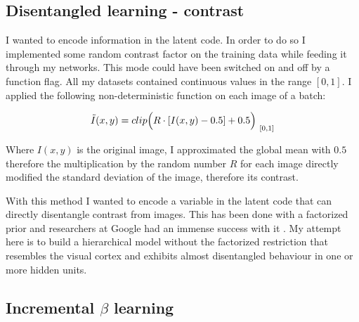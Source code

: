 \documentclass[12pt, english]{article}
\begin{document}
\vspace{7mm}

\subsection{Disentangled learning - contrast}

\vspace{5mm}

\par I wanted to encode information in the latent code. In order to do so I implemented some random contrast factor on the training data while feeding it through my networks. This mode could have been switched on and off by a function flag. All my datasets contained continuous values in the range $[0, 1]$. I applied the following non-deterministic function on each image of a batch:

\vspace{4mm}

\begin{equation}
    \Tilde{I}(x, y) = clip\Big(R \cdot [I(x, y) - 0.5] + 0.5\Big)_{\ [0, 1]}
\end{equation}

\vspace{4mm}

\par Where $I(x, y)$ is the original image, I approximated the global mean with $0.5$ therefore the multiplication by the random number $R$ for each image directly modified the standard deviation of the image, therefore its contrast.

\vspace{4mm}

\par With this method I wanted to encode a variable in the latent code that can directly disentangle contrast from images. This has been done with a factorized prior and researchers at Google had an immense success with it \cite{DBLP:journals/corr/abs-1811-12359}. My attempt here is to build a hierarchical model without the factorized restriction that resembles the visual cortex and exhibits almost disentangled behaviour in one or more hidden units.

\vspace{5mm}

\subsection{Incremental $\beta$ learning}
\end{document}
